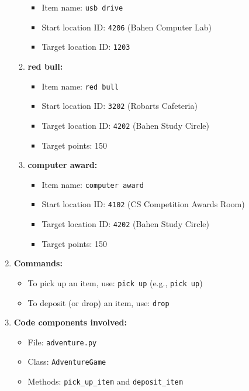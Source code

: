 \documentclass[11pt]{article}
\begin{document}
\begin{enumerate}
\begin{enumerate}
        \begin{itemize}
            \item Item name: \texttt{usb drive}
            \item Start location ID: \texttt{4206} (Bahen Computer Lab)
            \item Target location ID: \texttt{1203}
        \end{itemize}
        \item \textbf{red bull:}
        \begin{itemize}
            \item Item name: \texttt{red bull}
            \item Start location ID: \texttt{3202} (Robarts Cafeteria)
            \item Target location ID: \texttt{4202} (Bahen Study Circle)
            \item Target points: 150
        \end{itemize}
        \item \textbf{computer award:}
        \begin{itemize}
            \item Item name: \texttt{computer award}
            \item Start location ID: \texttt{4102} (CS Competition Awards Room)
            \item Target location ID: \texttt{4202} (Bahen Study Circle)
            \item Target points: 150
        \end{itemize}
    \end{enumerate}
    
    \item \textbf{Commands:}
    \begin{itemize}
        \item To pick up an item, use: \texttt{pick up} \quad (e.g., \texttt{pick up})
        \item To deposit (or drop) an item, use: \texttt{drop}
    \end{itemize}
    
    \item \textbf{Code components involved:}
    \begin{itemize}
        \item File: \texttt{adventure.py}
        \item Class: \texttt{AdventureGame}
        \item Methods: \texttt{pick\_up\_item} and \texttt{deposit\_item}
    \end{itemize}
\end{enumerate}
\end{document}
